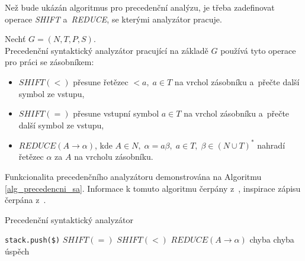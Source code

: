 Než bude ukázán algoritmus pro precedenční analýzu, je třeba zadefinovat operace \emph{SHIFT} a~\emph{REDUCE}, se kterými analyzátor pracuje.
\begin{definition}
    Nechť $G = (N, T, P, S)$.\\
    Precedenční syntaktický analyzátor pracující na základě $G$ používá tyto operace pro práci se zásobníkem:
    \begin{itemize}
        \item $SHIFT(<)$ přesune řetězec $<a,\; a \in T$ na vrchol zásobníku a~přečte další symbol ze vstupu,
        \item $SHIFT(=)$ přesune vstupní symbol $a \in T$ na vrchol zásobníku a~přečte další symbol ze vstupu,
        \item $REDUCE(A \rightarrow \alpha)$, kde $A \in N,\; \alpha = a\beta,\; a \in T,\; \beta \in (N \cup T)^*$ nahradí řetězec $\alpha$ za $A$ na vrcholu zásobníku.
    \end{itemize}
\end{definition}
Funkcionalita precedenčního analyzátoru demonstrována na Algoritmu \ref{alg_precedencni_sa}.
Informace k tomuto algoritmu čerpány z~\cite{medunaElementsOfCompDesign,meduna2017sa-zdola-nahoru}, inspirace zápisu čerpána z~\cite{kunda2022}.
\begin{algorithm}[h]
    \caption{Precedenční syntaktický analyzátor}
    \label{alg_precedencni_sa}
    \begin{algorithmic}[1]
        \NewLine
        \State \texttt{stack.push(\$)}
        \Repeat
                \Case{$=$}
                    \State $SHIFT(=)$
                \EndCase
                \Case{$<$}
                    \State $SHIFT(<)$
                \EndCase
                \Case{$>$}
                        \State $REDUCE(A \rightarrow \alpha)$
                    \Else
                        \State chyba 
                    \EndIf
                \EndCase
                \Case{$\times$}
                    \State chyba 
                \EndCase
                \Case{\checkmark}
                    \State úspěch
                \EndCase
            \EndSwitch
    \end{algorithmic}
\end{algorithm}

